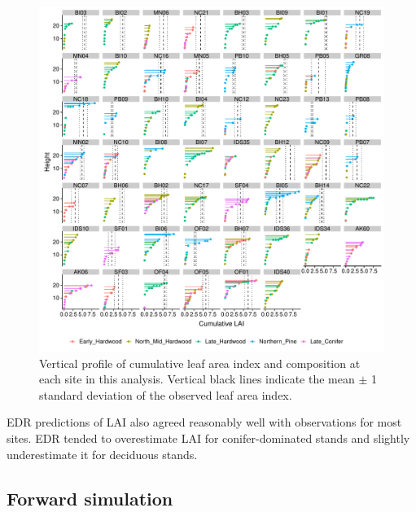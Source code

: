 \begin{figure}
  \centering
  \includegraphics[width=\textwidth]{4_edr/figures/explore_spectra/ed_cumlai_plot.pdf}
  \caption{%
    Vertical profile of cumulative leaf area index and composition at each site in this analysis.
    Vertical black lines indicate the mean $\pm$ 1 standard deviation of the observed leaf area index.
  }
\end{figure}

EDR predictions of LAI also agreed reasonably well with observations for most sites.
EDR tended to overestimate LAI for conifer-dominated stands and slightly underestimate it for deciduous stands.



\subsection{Forward simulation}

